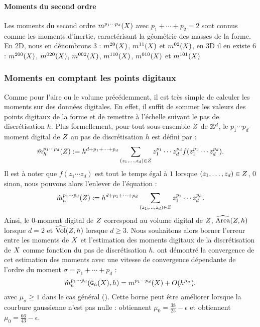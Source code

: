 \paragraph{Moments du second ordre}
%
Les moments du second ordre $\Mom{p_1 \cdots p_d}(\Shape)$ avec $p_1 + \cdots +
p_2 = 2$ sont connus comme les moments d'inertie, caractérisant la géométrie des
masses de la forme. En 2D, nous en dénombrons 3 : $\Mom{2 0}(\Shape)$, $\Mom{1
1}(\Shape)$ et $\Mom{0 2}(\Shape)$, en 3D il en existe 6 :  $\Mom{2 0
0}(\Shape)$, $\Mom{0 2 0}(\Shape)$, $\Mom{0 0 2}(\Shape)$, $\Mom{1 1
0}(\Shape)$, $\Mom{0 1 0}(\Shape)$ et $\Mom{1 0 1}(\Shape)$
%
\subsubsection{Moments en comptant les points digitaux}
\label{sec:MomentsByCounting}
%
Comme pour l'aire ou le volume précédemment, il est très simple de calculer les
moments sur des données digitales. En effet, il suffit de sommer les valeurs des
points digitaux de la forme et de remettre à l'échelle suivant le pas de
discrétisation $h$. Plus formellement, pour tout sous-ensemble $\DigShape$ de
$\Z^d$, le $p_1 \cdots p_d$-moment digital de $\DigShape$ au pas de
discrétisation $h$ est défini par :
%
\begin{equation}
  \DMom{p_1 \cdots p_d}{h}(\DigShape) \EqDef h^{d + p_1 + \cdots + p_d} \sum_{(z_1,\ldots,z_d) \in \DigShape} z_1^{p_1} \cdots z_d^{p_d} f(z_1^{p_1} \cdots z_d^{p_d}).
\end{equation}
%
Il est à noter que $f(z_1 \cdots z_d)$ est tout le temps égal à $1$ lorsque
$(z_1,\ldots,z_d) \in \DigShape$, $0$ sinon, nous pouvons alors l'enlever de
l'équation :
%
\begin{equation} \label{eq:MomentsByCounting-def}
%
  \DMom{p_1 \cdots p_d}{h}(\DigShape) \EqDef h^{d + p_1 + \cdots + p_d} \sum_{(z_1,\ldots,z_d) \in \DigShape} z_1^{p_1} \cdots z_d^{p_d}.
%
\end{equation}
%
Ainsi, le $0$-moment digital de $\DigShape$ correspond au volume digital de
$\DigShape$, \cad $\AreaC(\DigShape,h)$ lorsque $d = 2$ et $\VolC(\DigShape,h)$
lorsque $d \geq 3$.
%
Nous souhaitons alors borner l'erreur entre les moments de $\Shape$ et
l'estimation des moments digitaux de la discrétisation de $\Shape$ comme
fonction du pas de discrétisation $h$.  ont
démontré la convergence de cet estimation des moments avec une vitesse de
convergence dépendante de l'ordre du moment $\sigma = p_1 + \cdots + p_d$ :
%
\begin{equation} \label{eq:MomentsByCounting-conv}
%
  \DMom{p_1 \cdots p_d}{h}(\DigF{\Shape}{h},h) = \Mom{p_1 \cdots p_d}(\Shape) + O(h^{\mu_{\sigma}}).
%
\end{equation}
%
avec $\mu_{\sigma} \ge 1$ dans le cas général (). Cette
borne peut être améliorer lorsque la courbure gaussienne n'est pas nulle :
 obtiennent $\mu_0=\frac{38}{25}-\epsilon$ et
 obtiennent $\mu_0 = \frac{66}{43}-\epsilon$.
%
